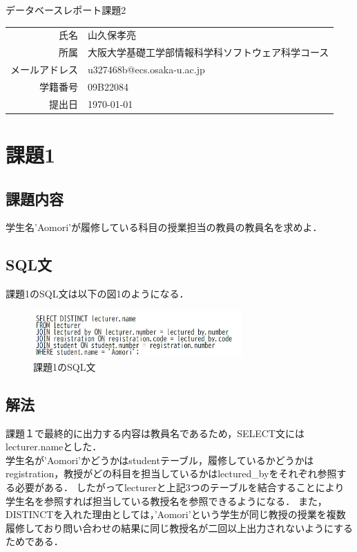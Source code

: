 \documentclass[dvipdfmx]{jarticle}
\begin{document}
\begin{titlepage}
    \begin{center}
        {\huge データベースレポート課題2}
        \vspace{180pt}\\
        \begin{tabular}{rl}
            氏名 & 山久保孝亮\\
            所属 & 大阪大学基礎工学部情報科学科ソフトウェア科学コース\\
            メールアドレス & u327468b@ecs.osaka-u.ac.jp\\
            学籍番号 & 09B22084\\
            提出日 & \today\\
        \end{tabular}
    \end{center}
\end{titlepage}
\section{課題1}
\subsection{課題内容}
学生名'Aomori'が履修している科目の授業担当の教員の教員名を求めよ．
\subsection{SQL文}
課題1のSQL文は以下の図1のようになる．
\begin{figure}[h]
    \centering
    \includegraphics[width = 8cm]{sql1.png}
    \caption{課題1のSQL文}
\end{figure}
\subsection{解法}
課題１で最終的に出力する内容は教員名であるため，SELECT文にはlecturer.nameとした．\\
学生名が'Aomori'かどうかはstudentテーブル，履修しているかどうかはregistration，教授がどの科目を担当しているかはlectured\_byをそれぞれ参照する必要がある．
したがってlecturerと上記3つのテーブルを結合することにより学生名を参照すれば担当している教授名を参照できるようになる．
また，DISTINCTを入れた理由としては，'Aomori'という学生が同じ教授の授業を複数履修しており問い合わせの結果に同じ教授名が二回以上出力されないようにするためである．
\end{document}
